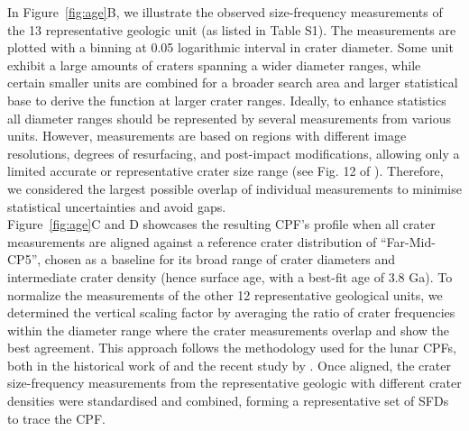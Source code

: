 \documentclass[preprint,12pt,3p,times,authoryear]{elsarticle}
\begin{document}
In Figure~\ref{fig:age}B, we illustrate the observed size-frequency measurements of the 13 representative geologic unit (as listed in Table S1). The measurements are plotted with a binning at 0.05 logarithmic interval in crater diameter.
Some unit exhibit a large amounts of craters spanning a wider diameter ranges, while certain smaller units are combined for a broader search area and larger statistical base to derive the function at larger crater ranges. Ideally, to enhance statistics all diameter ranges should be represented by several measurements from various units. However, measurements are based on regions with different image resolutions, degrees of resurfacing, and post-impact modifications, allowing only a limited accurate or representative crater size range (see Fig. 12 of \citealt{Bland2018}). Therefore, we considered the largest possible overlap of individual measurements to minimise statistical uncertainties and avoid gaps.\\


Figure~\ref{fig:age}C and D showcases the resulting CPF's profile when all crater measurements are aligned
against a reference crater distribution of ``Far-Mid-CP5'', chosen as a baseline for its broad range of crater diameters and intermediate crater density (hence surface age, with a best-fit age of 3.8 Ga).
To normalize the measurements of the other 12 representative geological units, we determined the vertical scaling factor by averaging the ratio of crater frequencies within the diameter range where the crater measurements overlap and show the best agreement.
This approach follows the methodology used for the lunar CPFs, both in the historical work of \citet{Neukum1975} and the recent study by \citet{Xiao2024}.
Once aligned, the crater size-frequency measurements from the representative geologic with different crater densities were standardised and combined, forming a representative set of SFDs to trace the CPF.\\

\end{document}
